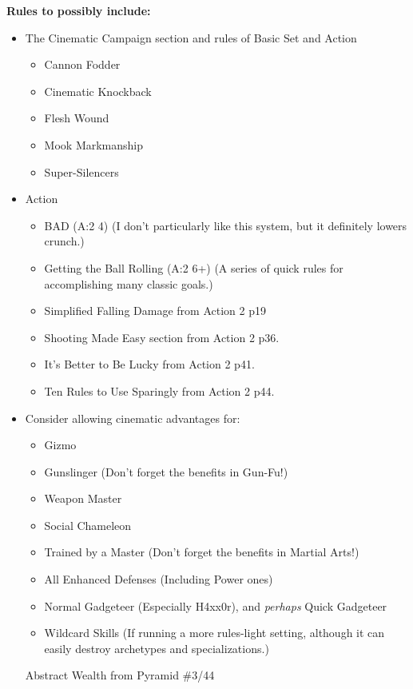 \begin{multicols}{2}
	\textbf{Rules to possibly include:}
	\begin{itemize}
		\itemsep 0pt
		\item The Cinematic Campaign section and rules of Basic Set and Action
		\begin{itemize}
			\itemsep 0pt
			\item Cannon Fodder
			\item Cinematic Knockback
			\item Flesh Wound
			\item Mook Markmanship
			\item Super-Silencers
		\end{itemize}
		\item \GURPS Action
		\begin{itemize}
			\itemsep 0pt
			\item BAD (A:2 4) (I don't particularly like this system, but it definitely lowers crunch.)
			\item Getting the Ball Rolling (A:2 6+) (A series of quick rules for accomplishing many classic goals.)
			\item Simplified Falling Damage from Action 2 p19
			\item Shooting Made Easy section from Action 2 p36.
			\item It's Better to Be Lucky from Action 2 p41.
			\item Ten Rules to Use Sparingly from Action 2 p44.
		\end{itemize}
		\item Consider allowing cinematic advantages for:
		\begin{itemize}
			\itemsep 0pt
			\item Gizmo
			\item Gunslinger (Don't forget the benefits in Gun-Fu!)
			\item Weapon Master
			\item Social Chameleon	
			\item Trained by a Master (Don't forget the benefits in Martial Arts!)
			\item All Enhanced Defenses (Including Power ones)
			\item Normal Gadgeteer (Especially H4xx0r), and \textit{perhaps} Quick Gadgeteer
			\item Wildcard Skills (If running a more rules-light setting, although it can easily destroy archetypes and specializations.)
		\end{itemize}
		Abstract Wealth from Pyramid \#3/44
	\end{itemize}
	

\end{multicols}
